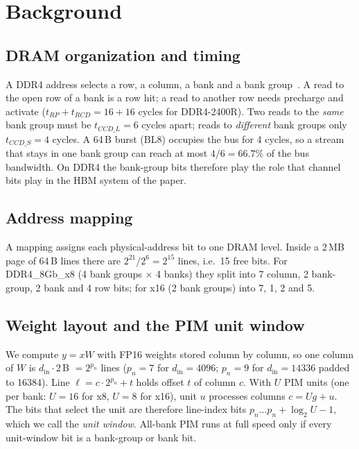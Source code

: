 \documentclass[conference]{IEEEtran}
\begin{document}
\section{Background}
\subsection{DRAM organization and timing}
A DDR4 address selects a row, a column, a bank and a bank group~\cite{jedec79_4}. A read to the open row of a bank is a row hit; a read to another row needs precharge and activate ($t_{RP}+t_{RCD}=16+16$ cycles for DDR4-2400R). Two reads to the \emph{same} bank group must be $t_{CCD\_L}=6$ cycles apart; reads to \emph{different} bank groups only $t_{CCD\_S}=4$ cycles. A 64\,B burst (BL8) occupies the bus for 4 cycles, so a stream that stays in one bank group can reach at most $4/6=66.7\%$ of the bus bandwidth. On DDR4 the bank-group bits therefore play the role that channel bits play in the HBM system of the paper.

\subsection{Address mapping}
A mapping assigns each physical-address bit to one DRAM level. Inside a 2\,MB page of 64\,B lines there are $2^{21}/2^{6}=2^{15}$ lines, i.e.\ 15 free bits. For DDR4\_8Gb\_x8 (4 bank groups $\times$ 4 banks) they split into 7 column, 2 bank-group, 2 bank and 4 row bits; for x16 (2 bank groups) into 7, 1, 2 and 5.

\subsection{Weight layout and the PIM unit window}
We compute $y=xW$ with FP16 weights stored column by column, so one column of $W$ is $d_{\mathrm{in}}\cdot 2$\,B $= 2^{p_n}$ lines ($p_n{=}7$ for $d_{\mathrm{in}}{=}4096$; $p_n{=}9$ for $d_{\mathrm{in}}{=}14336$ padded to 16384). Line $\ell = c\cdot 2^{p_n} + t$ holds offset $t$ of column $c$. With $U$ PIM units (one per bank: $U{=}16$ for x8, $U{=}8$ for x16), unit $u$ processes columns $c = U g + u$. The bits that select the unit are therefore line-index bits $p_n \ldots p_n+\log_2 U - 1$, which we call the \emph{unit window}. All-bank PIM runs at full speed only if every unit-window bit is a bank-group or bank bit.
\end{document}
